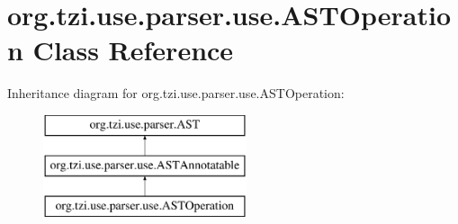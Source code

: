 \hypertarget{classorg_1_1tzi_1_1use_1_1parser_1_1use_1_1_a_s_t_operation}{\section{org.\-tzi.\-use.\-parser.\-use.\-A\-S\-T\-Operation Class Reference}
\label{classorg_1_1tzi_1_1use_1_1parser_1_1use_1_1_a_s_t_operation}
}
Inheritance diagram for org.\-tzi.\-use.\-parser.\-use.\-A\-S\-T\-Operation\-:\begin{figure}[H]
\begin{center}
\leavevmode
\includegraphics[height=3.000000cm]{classorg_1_1tzi_1_1use_1_1parser_1_1use_1_1_a_s_t_operation}
\end{center}
\end{figure}
